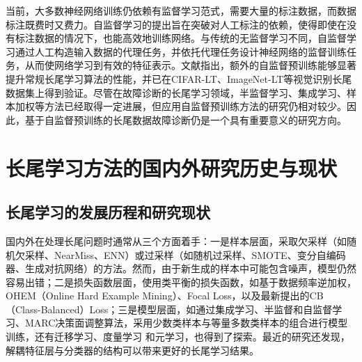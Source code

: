\documentclass[master]{thesis-uestc}
\begin{document}
当前，大多数神经网络训练仍依赖有监督学习范式，需要大量的标注数据，而数据标注既费时又费力。自监督学习的提出旨在突破对人工标注的依赖，使得即使在没有标注数据的情况下，也能高效地训练网络。与传统的无监督学习不同，自监督学习通过人工构造输入数据的代理任务，并依托代理任务设计神经网络的监督训练任务，从而使网络学习到有效的特征表示。文献\cite{zhang2021federated}指出，额外的自监督预训练能够显著提升常规长尾学习算法的性能，并已在CIFAR-LT、ImageNet-LT等视觉识别长尾数据集上得到验证。尽管在故障诊断的长尾学习领域，半监督学习、集成学习、样本加权等方法已经取得一定进展，但应用自监督预训练方法的研究仍相对较少。因此，基于自监督预训练的长尾数据故障诊断仍是一个具有重要意义的研究方向。

\section{长尾学习方法的国内外研究历史与现状}
\subsection{长尾学习的发展历程和研究现状}
国内外在处理长尾问题时通常从三个方面着手：一是样本层面，采取欠采样（如随机欠采样、NearMiss、ENN）或过采样（如随机过采样、SMOTE、变分自编码器、生成对抗网络）的方法。然而，由于新生成的样本中可能包含噪声，模型仍然容易出错；二是损失函数层面，使用类平衡的损失函数，如基于数据频率逆加权，OHEM（Online Hard Example Mining）、Focal Loss，以及最新提出的CB（Class-Balanced）Loss；三是模型层面，如通过集成学习、半监督和自监督学习、MARC决策面调整算法，采用少数类样本与等量多数类样本的组合进行模型训练，还有迁移学习、度量学习 和元学习，也得到了探索。最近的研究还发现，解耦特征层与分类器的结构可以带来更好的长尾学习结果。
\end{document}
